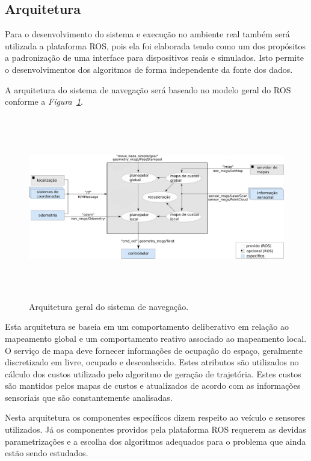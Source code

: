 \documentclass{article}
\newcommand{\fig}[1]{\textit{Figura~\ref{#1}}}
\begin{document}
\subsection{Arquitetura}

Para o desenvolvimento do sistema e execução no ambiente real também será
utilizada a plataforma ROS, pois ela foi elaborada tendo como um dos propósitos
a padronização de uma interface para dispositivos reais e simulados. Isto
permite o desenvolvimentos dos algoritmos de forma independente da fonte dos
dados.

A arquitetura do sistema de navegação será baseado no modelo geral do ROS
conforme a \fig{fig:arq}.

\begin{figure}[!h]
  	\centering
    \includegraphics[width=\textwidth,height=8cm]{../images/overview_tf_pt.png}
 	\caption{Arquitetura geral do sistema de navegação.}
 	\label{fig:arq}
\end{figure}

Esta arquitetura se baseia em um comportamento deliberativo em relação ao
mapeamento global e um comportamento reativo associado ao mapeamento local. O
serviço de mapa deve fornecer informações de ocupação do espaço, geralmente
discretizado em livre, ocupado e desconhecido. Estes atributos são utilizados no
cálculo dos custos utilizado pelo algoritmo de geração de trajetória. Estes
custos são mantidos pelos mapas de custos e atualizados de acordo com as
informações sensoriais que são constantemente analisadas.

Nesta arquitetura os componentes específicos dizem respeito ao veículo e
sensores utilizados. Já os componentes providos pela plataforma ROS requerem as
devidas parametrizações e a escolha dos algoritmos adequados para o problema que
ainda estão sendo estudados.
\end{document}
